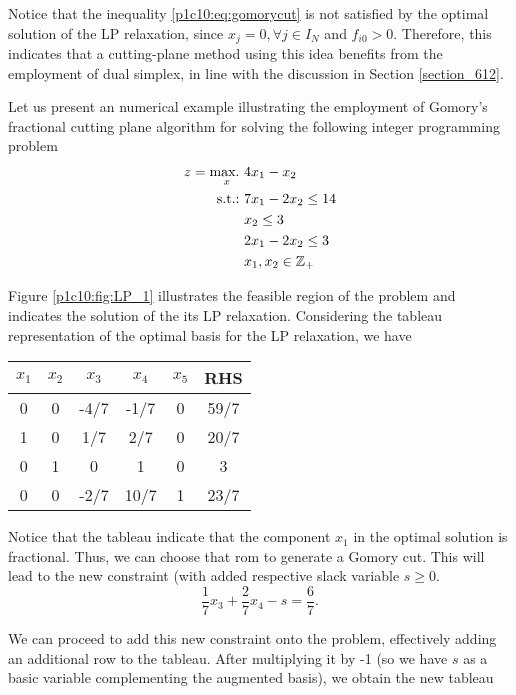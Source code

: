 Notice that the inequality \eqref{p1c10:eq:gomorycut} is not satisfied by the optimal solution of the LP relaxation, since $x_j = 0, \forall j \in I_N$ and $f_{i0} > 0$. Therefore, this indicates that a cutting-plane method using this idea benefits from the employment of dual simplex, in line with the discussion in Section \ref{section_612}. 

Let us present an numerical example illustrating the employment of Gomory's fractional cutting plane algorithm for solving the following integer programming problem
%
\begin{align*}
	z = \mathop{\text{max.~}}_x & 4x_1 - x_2\\
	\mathop{\text{s.t.:~}} & 7x_1 - 2x_2 \leq 14\\
	& x_2 \leq 3 \\
	&2x_1 -2x_2 \leq 3 \\
	&x_1, x_2 \in \mathbb{Z}_+ 
\end{align*}

Figure \ref{p1c10:fig:LP_1} illustrates the feasible region of the problem and indicates the solution of the its LP relaxation. Considering the tableau representation of the optimal basis for the LP relaxation, we have

\begin{center}
	\begin{tabular}{ccccc|c} 
		$x_1$ & $x_2$ & $x_3$ & $x_4$ & $x_5$ & RHS \\ \hline
		0 & 0 & -4/7 & -1/7 & 0 & 59/7 \\ \hline 
		1 & 0 & 1/7 & 2/7 & 0 & 20/7 \\
		0 & 1 &  0  &  1  & 0 & 3 \\
		0 & 0 & -2/7 & 10/7 & 1 & 23/7
	\end{tabular}	
\end{center}

Notice that the tableau indicate that the component $x_1$ in the optimal solution is fractional. Thus, we can choose that rom to generate a Gomory cut. This will lead to the new constraint (with added respective slack variable $s \ge 0$.
%
\begin{equation*}
	\frac{1}{7}x_3 + \frac{2}{7}x_4 - s = \frac{6}{7}.	
\end{equation*}

We can proceed to add this new constraint onto the problem, effectively adding an additional row to the tableau. After multiplying it by -1 (so we have $s$ as a basic variable complementing the augmented basis), we obtain the new tableau

